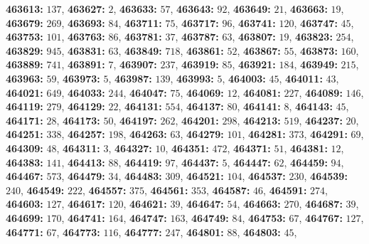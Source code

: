 \textsf{\bfseries 463613:} $137$, \textsf{\bfseries 463627:} $2$, \textsf{\bfseries 463633:} $57$, \textsf{\bfseries 463643:} $92$, \textsf{\bfseries 463649:} $21$, \textsf{\bfseries 463663:} $19$, \textsf{\bfseries 463679:} $269$, \textsf{\bfseries 463693:} $84$, \textsf{\bfseries 463711:} $75$, \textsf{\bfseries 463717:} $96$, \textsf{\bfseries 463741:} $120$, \textsf{\bfseries 463747:} $45$, \textsf{\bfseries 463753:} $101$, \textsf{\bfseries 463763:} $86$, \textsf{\bfseries 463781:} $37$, \textsf{\bfseries 463787:} $63$, \textsf{\bfseries 463807:} $19$, \textsf{\bfseries 463823:} $254$, \textsf{\bfseries 463829:} $945$, \textsf{\bfseries 463831:} $63$, \textsf{\bfseries 463849:} $718$, \textsf{\bfseries 463861:} $52$, \textsf{\bfseries 463867:} $55$, \textsf{\bfseries 463873:} $160$, \textsf{\bfseries 463889:} $741$, \textsf{\bfseries 463891:} $7$, \textsf{\bfseries 463907:} $237$, \textsf{\bfseries 463919:} $85$, \textsf{\bfseries 463921:} $184$, \textsf{\bfseries 463949:} $215$, \textsf{\bfseries 463963:} $59$, \textsf{\bfseries 463973:} $5$, \textsf{\bfseries 463987:} $139$, \textsf{\bfseries 463993:} $5$, \textsf{\bfseries 464003:} $45$, \textsf{\bfseries 464011:} $43$, \textsf{\bfseries 464021:} $649$, \textsf{\bfseries 464033:} $244$, \textsf{\bfseries 464047:} $75$, \textsf{\bfseries 464069:} $12$, \textsf{\bfseries 464081:} $227$, \textsf{\bfseries 464089:} $146$, \textsf{\bfseries 464119:} $279$, \textsf{\bfseries 464129:} $22$, \textsf{\bfseries 464131:} $554$, \textsf{\bfseries 464137:} $80$, \textsf{\bfseries 464141:} $8$, \textsf{\bfseries 464143:} $45$, \textsf{\bfseries 464171:} $28$, \textsf{\bfseries 464173:} $50$, \textsf{\bfseries 464197:} $262$, \textsf{\bfseries 464201:} $298$, \textsf{\bfseries 464213:} $519$, \textsf{\bfseries 464237:} $20$, \textsf{\bfseries 464251:} $338$, \textsf{\bfseries 464257:} $198$, \textsf{\bfseries 464263:} $63$, \textsf{\bfseries 464279:} $101$, \textsf{\bfseries 464281:} $373$, \textsf{\bfseries 464291:} $69$, \textsf{\bfseries 464309:} $48$, \textsf{\bfseries 464311:} $3$, \textsf{\bfseries 464327:} $10$, \textsf{\bfseries 464351:} $472$, \textsf{\bfseries 464371:} $51$, \textsf{\bfseries 464381:} $12$, \textsf{\bfseries 464383:} $141$, \textsf{\bfseries 464413:} $88$, \textsf{\bfseries 464419:} $97$, \textsf{\bfseries 464437:} $5$, \textsf{\bfseries 464447:} $62$, \textsf{\bfseries 464459:} $94$, \textsf{\bfseries 464467:} $573$, \textsf{\bfseries 464479:} $34$, \textsf{\bfseries 464483:} $309$, \textsf{\bfseries 464521:} $104$, \textsf{\bfseries 464537:} $230$, \textsf{\bfseries 464539:} $240$, \textsf{\bfseries 464549:} $222$, \textsf{\bfseries 464557:} $375$, \textsf{\bfseries 464561:} $353$, \textsf{\bfseries 464587:} $46$, \textsf{\bfseries 464591:} $274$, \textsf{\bfseries 464603:} $127$, \textsf{\bfseries 464617:} $120$, \textsf{\bfseries 464621:} $39$, \textsf{\bfseries 464647:} $54$, \textsf{\bfseries 464663:} $270$, \textsf{\bfseries 464687:} $39$, \textsf{\bfseries 464699:} $170$, \textsf{\bfseries 464741:} $164$, \textsf{\bfseries 464747:} $163$, \textsf{\bfseries 464749:} $84$, \textsf{\bfseries 464753:} $67$, \textsf{\bfseries 464767:} $127$, \textsf{\bfseries 464771:} $67$, \textsf{\bfseries 464773:} $116$, \textsf{\bfseries 464777:} $247$, \textsf{\bfseries 464801:} $88$, \textsf{\bfseries 464803:} $45$, 
